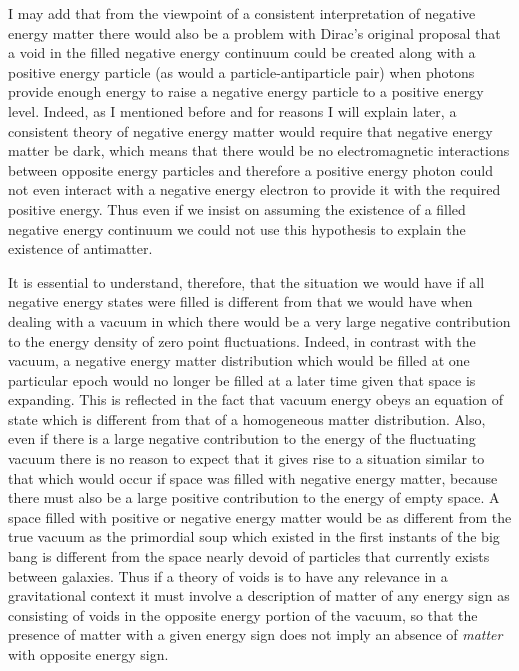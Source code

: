 \documentclass[notitlepage,12pt]{report}
\begin{document}
I may add that from the viewpoint of a consistent interpretation of negative energy matter there would also be a problem with Dirac's original proposal that a void in the filled negative energy continuum could be created along with a positive energy particle (as would a particle-antiparticle pair) when photons provide enough energy to raise a negative energy particle to a positive energy level. Indeed, as I mentioned before and for reasons I will explain later, a consistent theory of negative energy matter would require that negative energy matter be dark, which means that there would be no electromagnetic interactions between opposite energy particles and therefore a positive energy photon could not even interact with a negative energy electron to provide it with the required positive energy. Thus even if we insist on assuming the existence of a filled negative energy continuum we could not use this hypothesis to explain the existence of antimatter.

It is essential to understand, therefore, that the situation we would have if all negative energy states were filled is different from that we would have when dealing with a vacuum in which there would be a very large negative contribution to the energy density of zero point fluctuations. Indeed, in contrast with the vacuum, a negative energy matter distribution which would be filled at one particular epoch would no longer be filled at a later time given that space is expanding. This is reflected in the fact that vacuum energy obeys an equation of state which is different from that of a homogeneous matter distribution. Also, even if there is a large negative contribution to the energy of the fluctuating vacuum there is no reason to expect that it gives rise to a situation similar to that which would occur if space was filled with negative energy matter, because there must also be a large positive contribution to the energy of empty space. A space filled with positive or negative energy matter would be as different from the true vacuum as the primordial soup which existed in the first instants of the big bang is different from the space nearly devoid of particles that currently exists between galaxies. Thus if a theory of voids is to have any relevance in a gravitational context it must involve a description of matter of any energy sign as consisting of voids in the opposite energy portion of the vacuum, so that the presence of matter with a given energy sign does not imply an absence of \textit{matter} with opposite energy sign.
\end{document}
